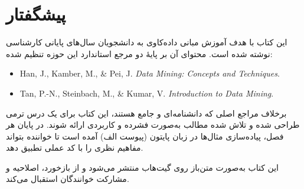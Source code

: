 \chapter*{پیشگفتار}

این کتاب با هدف آموزش مبانی داده‌کاوی به دانشجویان سال‌های پایانی کارشناسی نوشته شده است.
محتوای آن بر پایهٔ دو مرجع استاندارد این حوزه تنظیم شده:

\begin{itemize}
    \item Han, J., Kamber, M., \& Pei, J. \textit{Data Mining: Concepts and Techniques}.
    \item Tan, P.-N., Steinbach, M., \& Kumar, V. \textit{Introduction to Data Mining}.
\end{itemize}

برخلاف مراجع اصلی که دانشنامه‌ای و جامع هستند، این کتاب برای یک درس ترمی طراحی شده و
تلاش شده مطالب به‌صورت فشرده و کاربردی ارائه شوند. در پایان هر فصل، پیاده‌سازی مثال‌ها
در زبان پایتون (پیوست الف) آمده است تا خواننده بتواند مفاهیم نظری را با کد عملی تطبیق دهد.

این کتاب به‌صورت متن‌باز روی گیت‌هاب منتشر می‌شود و از بازخورد، اصلاحیه و مشارکت خوانندگان استقبال می‌کند.
